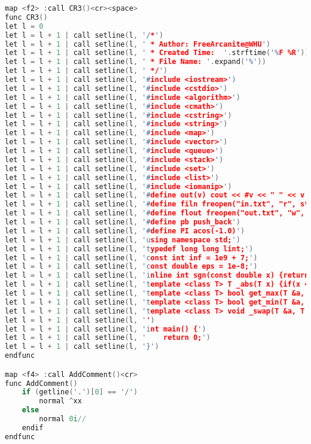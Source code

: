 \begin{lstlisting}[language=c++]
map <f2> :call CR3()<cr><space>
func CR3()
let l = 0
let l = l + 1 | call setline(l, '/*')
let l = l + 1 | call setline(l, ' * Author: FreeArcanite@WHU')
let l = l + 1 | call setline(l, ' * Created Time:  '.strftime('%F %R'))
let l = l + 1 | call setline(l, ' * File Name: '.expand('%'))
let l = l + 1 | call setline(l, ' */')
let l = l + 1 | call setline(l, '#include <iostream>')
let l = l + 1 | call setline(l, '#include <cstdio>')
let l = l + 1 | call setline(l, '#include <algorithm>')
let l = l + 1 | call setline(l, '#include <cmath>')
let l = l + 1 | call setline(l, '#include <cstring>')
let l = l + 1 | call setline(l, '#include <string>')
let l = l + 1 | call setline(l, '#include <map>')
let l = l + 1 | call setline(l, '#include <vector>')
let l = l + 1 | call setline(l, '#include <queue>')
let l = l + 1 | call setline(l, '#include <stack>')
let l = l + 1 | call setline(l, '#include <set>')
let l = l + 1 | call setline(l, '#include <list>')
let l = l + 1 | call setline(l, '#include <iomanip>')
let l = l + 1 | call setline(l, '#define out(v) cout << #v << " " << v << endl')
let l = l + 1 | call setline(l, '#define filn freopen("in.txt", "r", stdin)')
let l = l + 1 | call setline(l, '#define flout freopen("out.txt", "w", stdout)')
let l = l + 1 | call setline(l, '#define pb push_back')
let l = l + 1 | call setline(l, '#define PI acos(-1.0)')
let l = l + 1 | call setline(l, 'using namespace std;')
let l = l + 1 | call setline(l, 'typedef long long lint;')
let l = l + 1 | call setline(l, 'const int inf = 1e9 + 7;')
let l = l + 1 | call setline(l, 'const double eps = 1e-8;')
let l = l + 1 | call setline(l, 'inline int sgn(const double x) {return (x > eps) - (x < -eps);}')
let l = l + 1 | call setline(l, 'template <class T> T _abs(T x) {if(x < 0) x = -x; return x;}')
let l = l + 1 | call setline(l, 'template <class T> bool get_max(T &a, const T b) {return a < b ? a = b, true : false;}')
let l = l + 1 | call setline(l, 'template <class T> bool get_min(T &a, const T b) {return a > b ? a = b, true : false;}')
let l = l + 1 | call setline(l, 'template <class T> void _swap(T &a, T &b) {T t = a; a = b; b = t;}')
let l = l + 1 | call setline(l, '')
let l = l + 1 | call setline(l, 'int main() {')
let l = l + 1 | call setline(l, '    return 0;')
let l = l + 1 | call setline(l, '}')
endfunc

map <f4> :call AddComment()<cr>
func AddComment()
	if (getline('.')[0] == '/')
		normal ^xx
	else
		normal 0i//
	endif
endfunc
    \end{lstlisting}
